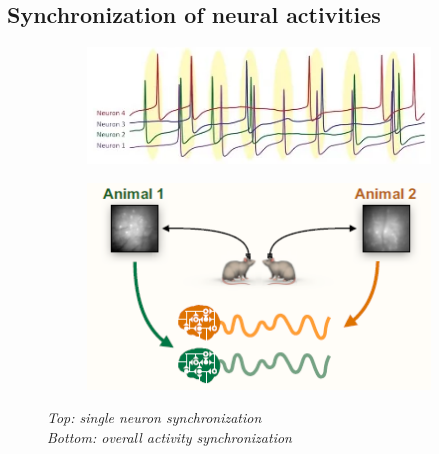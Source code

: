 \documentclass[a4paper]{article}
\begin{document}
\subsection{Synchronization of neural activities}

\begin{figure}[H]
	\begin{minipage}{\linewidth}
		\centering
		\begin{minipage}{0.6\linewidth}
			\begin{figure}[H]
				\includegraphics[width=\linewidth]{synch.png}
				
			\end{figure}
		\end{minipage}
		\hspace{0.05\linewidth}
		\begin{minipage}{0.6\linewidth}
			\begin{figure}[H]
				\includegraphics[width=\linewidth]{Intebrain.png}
				
			\end{figure}
		\end{minipage}
		
	\end{minipage}
\caption{\textit{Top: single neuron synchronization \\
		Bottom: overall activity synchronization}}
\end{figure}
\end{document}
